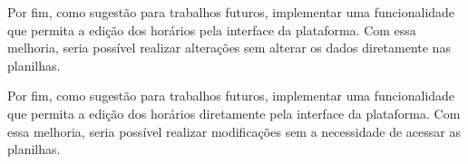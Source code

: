 Por fim, como sugestão para trabalhos futuros, implementar uma funcionalidade que permita a edição dos horários pela interface da plataforma. Com essa melhoria, seria possível realizar alterações sem alterar os dados diretamente nas planilhas.

Por fim, como sugestão para trabalhos futuros, implementar uma funcionalidade que permita a edição dos horários diretamente pela interface da plataforma. Com essa melhoria, seria possível realizar modificações sem a necessidade de acessar as planilhas.